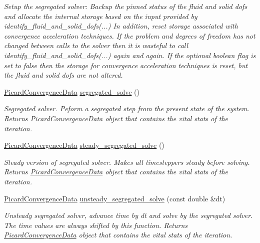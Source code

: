 \begin{DoxyCompactItemize}
\begin{DoxyCompactList}\small\item\em Setup the segregated solver\+: Backup the pinned status of the fluid and solid dofs and allocate the internal storage based on the input provided by identify\+\_\+fluid\+\_\+and\+\_\+solid\+\_\+dofs(...) In addition, reset storage associated with convergence acceleration techniques. If the problem and degrees of freedom has not changed between calls to the solver then it is wasteful to call identify\+\_\+fluid\+\_\+and\+\_\+solid\+\_\+dofs(...) again and again. If the optional boolean flag is set to false then the storage for convergence acceleration techniques is reset, but the fluid and solid dofs are not altered. \end{DoxyCompactList}\item 
\hyperlink{classoomph_1_1PicardConvergenceData}{Picard\+Convergence\+Data} \hyperlink{classoomph_1_1SegregatableFSIProblem_a87a69561674c1e596bb205e0fc4a387f}{segregated\+\_\+solve} ()
\begin{DoxyCompactList}\small\item\em Segregated solver. Peform a segregated step from the present state of the system. Returns \hyperlink{classoomph_1_1PicardConvergenceData}{Picard\+Convergence\+Data} object that contains the vital stats of the iteration. \end{DoxyCompactList}\item 
\hyperlink{classoomph_1_1PicardConvergenceData}{Picard\+Convergence\+Data} \hyperlink{classoomph_1_1SegregatableFSIProblem_a8f8145df86358916df505e2b513caf6a}{steady\+\_\+segregated\+\_\+solve} ()
\begin{DoxyCompactList}\small\item\em Steady version of segregated solver. Makes all timesteppers steady before solving. Returns \hyperlink{classoomph_1_1PicardConvergenceData}{Picard\+Convergence\+Data} object that contains the vital stats of the iteration. \end{DoxyCompactList}\item 
\hyperlink{classoomph_1_1PicardConvergenceData}{Picard\+Convergence\+Data} \hyperlink{classoomph_1_1SegregatableFSIProblem_aae43b43dbc197d238535bcb5c3acf168}{unsteady\+\_\+segregated\+\_\+solve} (const double \&dt)
\begin{DoxyCompactList}\small\item\em Unsteady segregated solver, advance time by dt and solve by the segregated solver. The time values are always shifted by this function. Returns \hyperlink{classoomph_1_1PicardConvergenceData}{Picard\+Convergence\+Data} object that contains the vital stats of the iteration. \end{DoxyCompactList}\item 

\end{DoxyCompactItemize}
